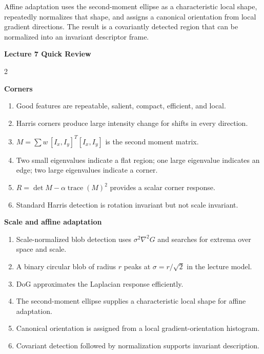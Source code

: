 \documentclass[11pt,a4paper,oneside]{report}
\newcommand{\reviewgroup}[1]{%
  \par\vspace{0.7em}%
  {\sffamily\bfseries\color{SapienzaRed}#1}\par\vspace{0.10em}%
}
\begin{document}
\begin{chaptersummary}
Affine adaptation uses the second-moment ellipse as a characteristic local shape, repeatedly normalizes that shape, and assigns a canonical orientation from local gradient directions. The result is a covariantly detected region that can be normalized into an invariant descriptor frame.
\end{chaptersummary}

\clearpage
{}
{}
\begin{center}
{\sffamily\fontsize{22}{26}\selectfont\bfseries\color{Ink}Lecture 7 Quick Review\par}
\vspace{0.35em}{\color{SapienzaRed}\rule{0.82\textwidth}{0.8pt}}
\end{center}
\begin{multicols}{2}
\normalsize
\reviewgroup{Corners}
\begin{enumerate}[label=\textcolor{SapienzaRed}{\bfseries\arabic*.},leftmargin=1.8em,itemsep=0.36em]
\item Good features are repeatable, salient, compact, efficient, and local.
\item Harris corners produce large intensity change for shifts in every direction.
\item $M=\sum w\,[I_x,I_y]^T[I_x,I_y]$ is the second moment matrix.
\item Two small eigenvalues indicate a flat region; one large eigenvalue indicates an edge; two large eigenvalues indicate a corner.
\item $R=\det M-\alpha\operatorname{trace}(M)^2$ provides a scalar corner response.
\item Standard Harris detection is rotation invariant but not scale invariant.
\end{enumerate}
\reviewgroup{Scale and affine adaptation}
\begin{enumerate}[resume,label=\textcolor{SapienzaRed}{\bfseries\arabic*.},leftmargin=1.8em,itemsep=0.36em]
\item Scale-normalized blob detection uses $\sigma^2\nabla^2G$ and searches for extrema over space and scale.
\item A binary circular blob of radius $r$ peaks at $\sigma=r/\sqrt2$ in the lecture model.
\item DoG approximates the Laplacian response efficiently.
\item The second-moment ellipse supplies a characteristic local shape for affine adaptation.
\item Canonical orientation is assigned from a local gradient-orientation histogram.
\item Covariant detection followed by normalization supports invariant description.
\end{enumerate}
\end{multicols}
\end{document}
